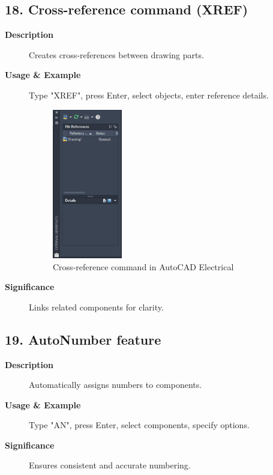 \documentclass[12pt]{article}
\begin{document}
\subsection*{18. Cross-reference command (XREF)}
\begin{description}
    \item [\textbf{Description}] Creates cross-references between drawing parts.
    \item [\textbf{Usage \& Example}] Type "XREF", press Enter, select objects, enter reference details.
          \begin{figure}[H]
              \centering
              \includegraphics[width=0.3\textwidth]{cross_reference_command.png}
              \caption{Cross-reference command in AutoCAD Electrical}
          \end{figure}
    \item [\textbf{Significance}] Links related components for clarity.
\end{description}

\subsection*{19. AutoNumber feature}
\begin{description}
    \item [\textbf{Description}] Automatically assigns numbers to components.
    \item [\textbf{Usage \& Example}] Type "AN", press Enter, select components, specify options.
    \item [\textbf{Significance}] Ensures consistent and accurate numbering.
\end{description}
\end{document}
